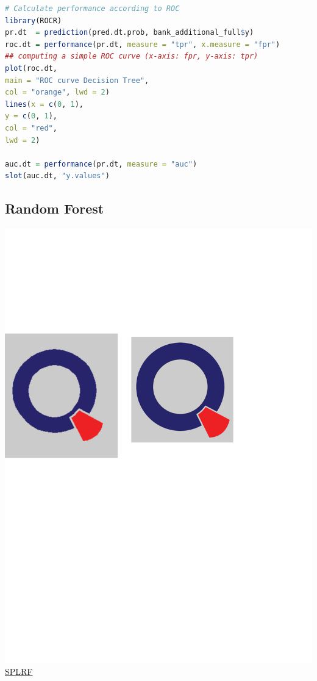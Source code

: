 \documentclass[12pt, a4paper, bibliography=totoc, english]{scrartcl}
\begin{document}
\begin{lstlisting}[language = R]
# Calculate performance according to ROC
library(ROCR)
pr.dt  = prediction(pred.dt.prob, bank_additional_full$y)
roc.dt = performance(pr.dt, measure = "tpr", x.measure = "fpr")  
## computing a simple ROC curve (x-axis: fpr, y-axis: tpr)
plot(roc.dt,
main = "ROC curve Decision Tree", 
col = "orange", lwd = 2)
lines(x = c(0, 1),
y = c(0, 1), 
col = "red", 
lwd = 2)

auc.dt = performance(pr.dt, measure = "auc")
slot(auc.dt, "y.values")
\end{lstlisting}

\subsection{Random Forest}
\includegraphics[scale=0.08]{qletlogo}
\textcolor{blue}{\href{https://github.com/JingyiLiu3136/MLFBM/blob/master/RF/SPLRF.R}{SPLRF}}
\end{document}
